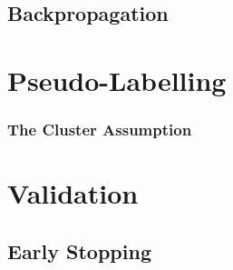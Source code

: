 		\subsection{Backpropagation}


	\section {Pseudo-Labelling}

		\subsubsection {The Cluster Assumption}

	\section {Validation}
		
		\subsection{Early Stopping}